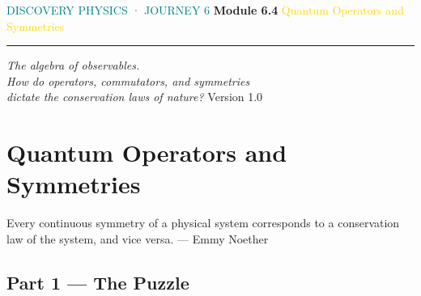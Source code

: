 \documentclass[12pt, a4paper, twoside]{book}
\begin{document}
\begin{titlepage}
\pagecolor{deep}\color{white}\centering\vspace*{1.8cm}


\vspace{0.8cm}
{\fontsize{11}{14}\selectfont\textcolor{teal}{\MakeUppercase{Discovery Physics · Journey 6}}}
\vspace{0.3cm}
{\fontsize{34}{40}\selectfont\bfseries Module 6.4}
\vspace{0.3cm}
{\fontsize{20}{26}\selectfont\textcolor{gold}{%
Quantum Operators and\\
Symmetries}}
\vspace{0.5cm}
\textcolor{white!60}{\rule{8cm}{0.4pt}}
\vspace{0.4cm}
{\fontsize{12}{18}\selectfont\textcolor{white!80}{\itshape
The algebra of observables.\\[4pt]
How do operators, commutators, and symmetries\\
dictate the conservation laws of nature?}}
\vfill\textcolor{white!30}{\small Version 1.0}
\end{titlepage}
\nopagecolor
\tableofcontents

\chapter{Quantum Operators and Symmetries}

\begin{epigraph}
{Every continuous symmetry of a physical system corresponds to a conservation law of the system, and vice versa.}
{--- Emmy Noether}
\end{epigraph}

\section{Part 1 --- The Puzzle}
\end{document}
